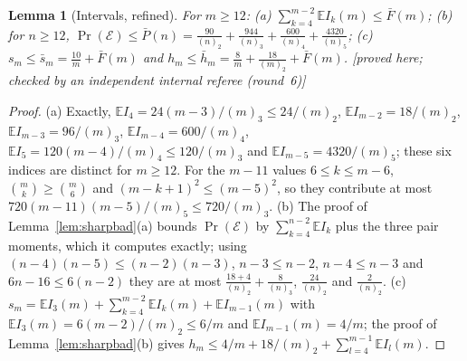 \documentclass[11pt,a4paper]{article}
\theoremstyle{plain}
\newtheorem{lemma}[theorem]{Lemma}
\theoremstyle{definition}
\theoremstyle{remark}
\newcommand{\status}[1]{\textsf{\small [#1]}}
\begin{document}
\begin{lemma}[Intervals, refined]\label{lem:intref}
For $m\ge12$: (a) $\sum_{k=4}^{m-2}\mathbb EI_k(m)\le\bar F(m)$; (b) for $n\ge12$, $\Pr(\mathcal E)\le\bar P(n)=\frac{90}{(n)_2}+\frac{944}{(n)_3}+\frac{600}{(n)_4}+\frac{4320}{(n)_5}$; (c) $s_m\le\bar s_m=\frac{10}m+\bar F(m)$ and $h_m\le\bar h_m=\frac8m+\frac{18}{(m)_2}+\bar F(m)$. \status{proved here; checked by an independent internal referee (round~6)}
\end{lemma}

\begin{proof}
(a) Exactly, $\mathbb EI_4=24(m-3)/(m)_3\le24/(m)_2$, $\mathbb EI_{m-2}=18/(m)_2$, $\mathbb EI_{m-3}=96/(m)_3$, $\mathbb EI_{m-4}=600/(m)_4$, $\mathbb EI_5=120(m-4)/(m)_4\le120/(m)_3$ and $\mathbb EI_{m-5}=4320/(m)_5$; these six indices are distinct for $m\ge12$. For the $m-11$ values $6\le k\le m-6$, $\binom mk\ge\binom m6$ and $(m-k+1)^2\le(m-5)^2$, so they contribute at most $720(m-11)(m-5)/(m)_5\le720/(m)_3$. (b) The proof of Lemma~\ref{lem:sharpbad}(a) bounds $\Pr(\mathcal E)$ by $\sum_{k=4}^{n-2}\mathbb EI_k$ plus the three pair moments, which it computes exactly; using $(n-4)(n-5)\le(n-2)(n-3)$, $n-3\le n-2$, $n-4\le n-3$ and $6n-16\le6(n-2)$ they are at most $\frac{18+4}{(n)_2}+\frac8{(n)_3}$, $\frac{24}{(n)_2}$ and $\frac2{(n)_2}$. (c) $s_m=\mathbb EI_3(m)+\sum_{k=4}^{m-2}\mathbb EI_k(m)+\mathbb EI_{m-1}(m)$ with $\mathbb EI_3(m)=6(m-2)/(m)_2\le6/m$ and $\mathbb EI_{m-1}(m)=4/m$; the proof of Lemma~\ref{lem:sharpbad}(b) gives $h_m\le4/m+18/(m)_2+\sum_{l=4}^{m-1}\mathbb EI_l(m)$.
\end{proof}
\end{document}
